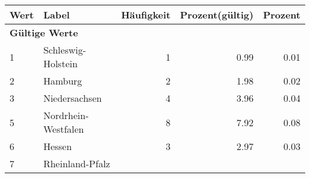      \begin{longtable}{lXrrr}
     \toprule
     \textbf{Wert} & \textbf{Label} & \textbf{Häufigkeit} & \textbf{Prozent(gültig)} & \textbf{Prozent} \\
     \endhead
     \midrule
     \multicolumn{5}{l}{\textbf{Gültige Werte}}\\

     1 &
     \multicolumn{1}{X}{ Schleswig-Holstein   } &


       \num{1} &
       \num[round-mode=places,round-precision=2]{0,99} &
         \num[round-mode=places,round-precision=2]{0,01} \\

     2 &
     \multicolumn{1}{X}{ Hamburg   } &


       \num{2} &
       \num[round-mode=places,round-precision=2]{1,98} &
         \num[round-mode=places,round-precision=2]{0,02} \\

     3 &
     \multicolumn{1}{X}{ Niedersachsen   } &


       \num{4} &
       \num[round-mode=places,round-precision=2]{3,96} &
         \num[round-mode=places,round-precision=2]{0,04} \\

     5 &
     \multicolumn{1}{X}{ Nordrhein-Westfalen   } &


       \num{8} &
       \num[round-mode=places,round-precision=2]{7,92} &
         \num[round-mode=places,round-precision=2]{0,08} \\

     6 &
     \multicolumn{1}{X}{ Hessen   } &


       \num{3} &
       \num[round-mode=places,round-precision=2]{2,97} &
         \num[round-mode=places,round-precision=2]{0,03} \\

     7 &
     \multicolumn{1}{X}{ Rheinland-Pfalz   } &



\end{longtable}
